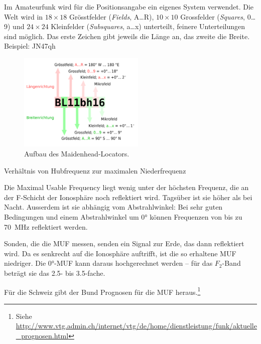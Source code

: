 {Im Amateurfunk wird für die Positionsangabe ein eigenes System verwendet. Die Welt wird in $18\times 18$ Grösstfelder (\textit{Fields}, A…R), $10\times 10$ Grossfelder (\textit{Squares}, 0…9) und $24\times 24$ Kleinfelder (\textit{Subsquares}, a…x) unterteilt, feinere Unterteilungen sind möglich. Das erste Zeichen gibt jeweils die Länge an, das zweite die Breite. Beispiel: JN47qh

\begin{figure}[h!]
 \centering
 \includegraphics[width=6cm]{./png/Maidenhead_QTH-Locator_erklaert.png}
 \caption{Aufbau des Maidenhead-Locators. }
 \label{fig:maidenhead}
\end{figure}

}

{Verhältnis von Hubfrequenz zur maximalen Niederfrequenz}

{Die Maximal Usable Frequency liegt wenig unter der höchsten Frequenz, die an der F-Schicht der Ionosphäre noch reflektiert wird. Tagsüber ist sie höher als bei Nacht. Ausserdem ist sie abhängig vom Abstrahlwinkel: Bei sehr guten Bedingungen und einem Abstrahlwinkel um 0° können Frequenzen von bis zu 70 MHz reflektiert werden.

Sonden, die die MUF messen, senden ein Signal zur Erde, das dann reflektiert wird. Da es senkrecht auf die Ionosphäre auftrifft, ist die so erhaltene MUF niedriger. Die 0°-MUF kann daraus hochgerechnet werden – für das $F_2$-Band beträgt sie das 2.5- bis 3.5-fache.

Für die Schweiz gibt der Bund Prognosen für die MUF heraus.\footnote{Siehe \href{http://www.vtg.admin.ch/internet/vtg/de/home/dienstleistung/funk/aktuelle\_prognosen.html}{http://www.vtg.admin.ch/internet/vtg/de/home/dienstleistung/funk/aktuelle\_prognosen.html}} }

